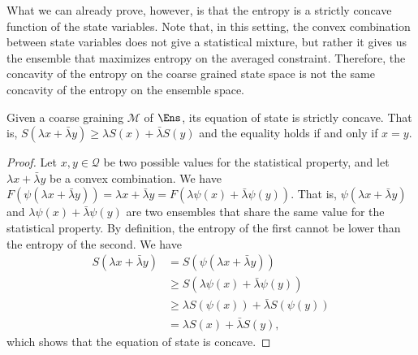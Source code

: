 What we can already prove, however, is that the entropy is a strictly concave function of the state variables. Note that, in this setting, the convex combination between state variables does not give a statistical mixture, but rather it gives us the ensemble that maximizes entropy on the averaged constraint. Therefore, the concavity of the entropy on the coarse grained state space is not the same concavity of the entropy on the ensemble space.

\begin{mathSection}
\begin{prop}
	Given a coarse graining $\mathcal{M}$ of $\Ens$, its equation of state is strictly concave. That is, $S(\lambda x + \bar{\lambda} y) \geq \lambda S(x) + \bar{\lambda} S(y)$ and the equality holds if and only if $x=y$.
\end{prop}

\begin{proof}
	Let $x, y \in \mathcal{Q}$ be two possible values for the statistical property, and let $\lambda x + \bar{\lambda} y$ be a convex combination. We have $F(\psi(\lambda x + \bar{\lambda} y)) = \lambda x + \bar{\lambda} y = F(\lambda \psi(x) + \bar{\lambda} \psi(y))$. That is, $\psi(\lambda x + \bar{\lambda} y)$ and $\lambda \psi(x) + \bar{\lambda} \psi(y)$ are two ensembles that share the same value for the statistical property. By definition, the entropy of the first cannot be lower than the entropy of the second. We have
	\begin{equation}
		\begin{aligned}
			S(\lambda x + \bar{\lambda} y) &= S(\psi(\lambda x + \bar{\lambda} y)) \\
			&\geq S(\lambda \psi(x) + \bar{\lambda} \psi(y)) \\
			&\geq \lambda S(\psi(x)) + \bar{\lambda} S(\psi(y)) \\
			&= \lambda S(x) + \bar{\lambda} S(y),
		\end{aligned}
	\end{equation}
	which shows that the equation of state is concave.
	

\end{proof}
\end{mathSection}
